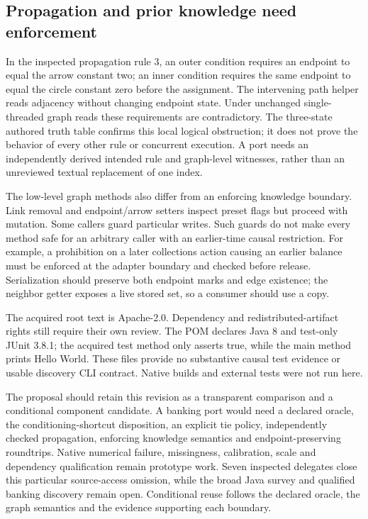 \subsection{Propagation and prior knowledge need enforcement}
In the inspected propagation rule 3, an outer condition requires an endpoint
to equal the arrow constant two; an inner condition requires the same endpoint
to equal the circle constant zero before the assignment. The intervening path
helper reads adjacency without changing endpoint state. Under unchanged
single-threaded graph reads these requirements are contradictory. The
three-state authored truth table confirms this local logical obstruction;
it does not prove the behavior of every other rule or concurrent execution.
A port needs an independently derived intended rule and graph-level witnesses,
rather than an unreviewed textual replacement of one index.
\citep{exec28_fj_java,exec28_fj_reference}

The low-level graph methods also differ from an enforcing knowledge boundary.
Link removal and endpoint/arrow setters inspect preset flags but proceed with
mutation. Some callers guard particular writes. Such guards do not make every
method safe for an arbitrary caller with an earlier-time causal restriction.
For example, a prohibition on a later collections action causing an earlier
balance must be enforced at the adapter boundary and checked before release.
Serialization should preserve both endpoint marks and edge existence; the
neighbor getter exposes a live stored set, so a consumer should use a copy.
\citep{exec28_fj_java}

The acquired root text is Apache-2.0. Dependency and redistributed-artifact
rights still require their own review. The POM declares Java 8 and test-only
JUnit 3.8.1; the acquired test method only asserts true, while the main method
prints Hello World. These files provide no substantive causal test evidence
or usable discovery CLI contract. Native builds and external tests were not
run here.\citep{exec28_fj_java}

The proposal should retain this revision as a transparent comparison and a
conditional component candidate. A banking port would need a declared oracle,
the conditioning-shortcut disposition, an explicit tie policy, independently
checked propagation, enforcing knowledge semantics and endpoint-preserving
roundtrips. Native numerical failure, missingness, calibration, scale and
dependency qualification remain prototype work. Seven inspected delegates
close this particular source-access omission, while the broad Java survey and
qualified banking discovery remain open. Conditional reuse follows the
declared oracle, the graph semantics and the evidence supporting each boundary.
